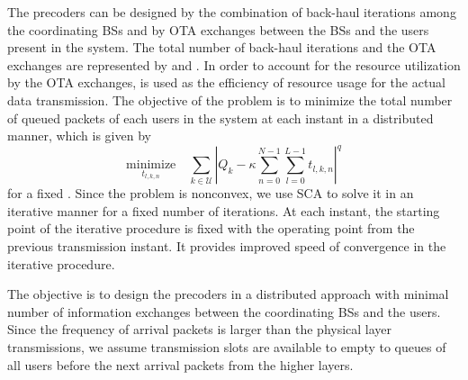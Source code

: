 
The precoders can be designed by the combination of back-haul iterations among the coordinating \acp{BS} and by \ac{OTA} exchanges between the \acp{BS} and the users present in the system. The total number of back-haul iterations and the \ac{OTA} exchanges are represented by  and . In order to account for the resource utilization by the \ac{OTA} exchanges, \me{\kappa} is used as the efficiency of resource usage for the actual data transmission. The objective of the problem is to minimize the total number of queued packets of each users in the system at each instant in a distributed manner, which is given by
\begin{equation}
\underset{t_{l,k,n}}{\text{minimize}} \quad \sum_{k \in \mathcal{U}} \left | Q_k - \kappa \sum_{n = 0}^{N-1} \sum_{l = 0}^{L-1} t_{l,k,n} \right |^q
\end{equation}
for a fixed \me{\kappa}. Since the problem is nonconvex, we use \ac{SCA} to solve it in an iterative manner for a fixed number of iterations. At each instant, the starting point of the iterative procedure is fixed with the operating point from the previous transmission instant. It provides improved speed of convergence in the iterative procedure.

The objective is to design the precoders in a distributed approach with minimal number of information exchanges between the coordinating \acp{BS} and the users. Since the frequency of arrival packets is larger than the physical layer transmissions, we assume  transmission slots are available to empty to queues of all users before the next arrival packets from the higher layers.
